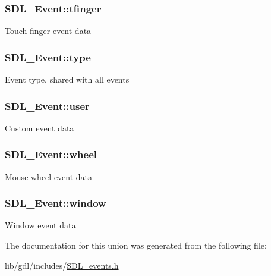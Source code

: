 \subsubsection[{tfinger}]{ S\+D\+L\+\_\+\+Event\+::tfinger}\label{union_s_d_l___event_ab18d7d60794cb056948ffa58541bc3c5}
Touch finger event data \hypertarget{union_s_d_l___event_a237648bec242d2d5835f1a4250ddfa46}{}
\subsubsection[{type}]{ S\+D\+L\+\_\+\+Event\+::type}\label{union_s_d_l___event_a237648bec242d2d5835f1a4250ddfa46}
Event type, shared with all events \hypertarget{union_s_d_l___event_ab7c394e3ce7bf1e4f8d68bc0e9f1b042}{}
\subsubsection[{user}]{ S\+D\+L\+\_\+\+Event\+::user}\label{union_s_d_l___event_ab7c394e3ce7bf1e4f8d68bc0e9f1b042}
Custom event data \hypertarget{union_s_d_l___event_a267d3f550715519ec90a81ccd0e6cbda}{}
\subsubsection[{wheel}]{ S\+D\+L\+\_\+\+Event\+::wheel}\label{union_s_d_l___event_a267d3f550715519ec90a81ccd0e6cbda}
Mouse wheel event data \hypertarget{union_s_d_l___event_a826936b3275406d857bc6654669fae71}{}
\subsubsection[{window}]{ S\+D\+L\+\_\+\+Event\+::window}\label{union_s_d_l___event_a826936b3275406d857bc6654669fae71}
Window event data 

The documentation for this union was generated from the following file\+:\begin{DoxyCompactItemize}
\item 
lib/gdl/includes/\hyperlink{_s_d_l__events_8h}{S\+D\+L\+\_\+events.\+h}\end{DoxyCompactItemize}
